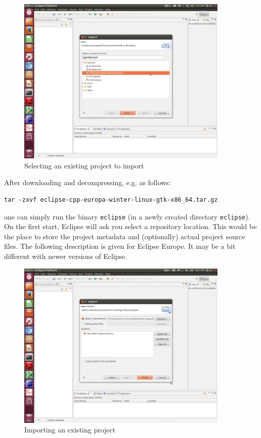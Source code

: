 \documentclass[runningheads,a4paper]{llncs}
\newcommand{\ttt}[1]{\texttt{#1}}
\begin{document}
{\begin{figure}
\centering
\caption{\label{FigEclipse1}Selecting an existing project to import}
\includegraphics[width=0.9\textwidth]{figures/Eclipse1.pdf}
\end{figure}

After downloading and decompressing, e.g. as follows:
\begin{verbatim}
tar -zxvf eclipse-cpp-europa-winter-linux-gtk-x86_64.tar.gz
\end{verbatim}
one can simply run the binary \ttt{eclipse} (in a
newly created directory \ttt{eclipse}).
On the first start, Eclipse will ask you select a repository location.
This would be the place to store the project metadata and (optionally)
actual project source files.
The following description is given for Eclipse Europe. 
It may be a bit different with newer versions of Eclipse.


\begin{figure}
\centering
\caption{\label{FigEclipse2}Importing an existing project}
\includegraphics[width=0.9\textwidth]{figures/Eclipse2.pdf}
\end{figure}

}
\end{document}
